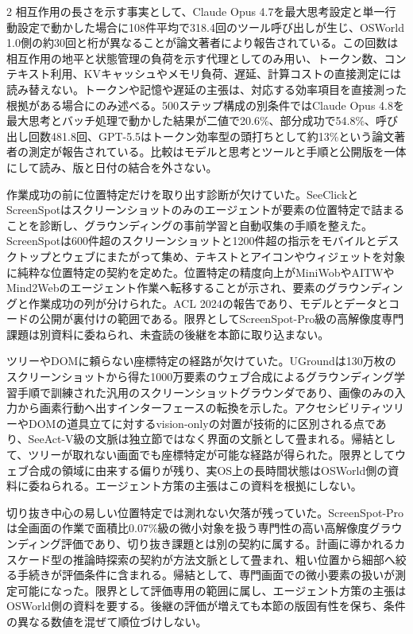 \documentclass[lualatex,a4paper,10pt]{jlreq}
\begin{document}
\begin{multicols}{2}
\noindent 相互作用の長さを示す事実として、Claude Opus 4.7を最大思考設定と単一行動設定で動かした場合に108件平均で318.4回のツール呼び出しが生じ、OSWorld 1.0側の約30回と桁が異なることが論文著者により報告されている。この回数は相互作用の地平と状態管理の負荷を示す代理としてのみ用い、トークン数、コンテキスト利用、KVキャッシュやメモリ負荷、遅延、計算コストの直接測定には読み替えない。トークンや記憶や遅延の主張は、対応する効率項目を直接測った根拠がある場合にのみ述べる。500ステップ構成の別条件ではClaude Opus 4.8を最大思考とバッチ処理で動かした結果が二値で20.6\%、部分成功で54.8\%、呼び出し回数481.8回、GPT-5.5はトークン効率型の頭打ちとして約13\%という論文著者の測定が報告されている。比較はモデルと思考とツールと手順と公開版を一体にして読み、版と日付の結合を外さない。\autocite{vmd091}\par\medskip
\noindent 作業成功の前に位置特定だけを取り出す診断が欠けていた。SeeClickとScreenSpotはスクリーンショットのみのエージェントが要素の位置特定で詰まることを診断し、グラウンディングの事前学習と自動収集の手順を整えた。ScreenSpotは600件超のスクリーンショットと1200件超の指示をモバイルとデスクトップとウェブにまたがって集め、テキストとアイコンやウィジェットを対象に純粋な位置特定の契約を定めた。位置特定の精度向上がMiniWobやAITWやMind2Webのエージェント作業へ転移することが示され、要素のグラウンディングと作業成功の列が分けられた。ACL 2024の報告であり、モデルとデータとコードの公開が裏付けの範囲である。限界としてScreenSpot-Pro級の高解像度専門課題は別資料に委ねられ、未査読の後継を本節に取り込まない。\autocite{vmd092}\par\medskip
\noindent ツリーやDOMに頼らない座標特定の経路が欠けていた。UGroundは130万枚のスクリーンショットから得た1000万要素のウェブ合成によるグラウンディング学習手順で訓練された汎用のスクリーンショットグラウンダであり、画像のみの入力から画素行動へ出すインターフェースの転換を示した。アクセシビリティツリーやDOMの道具立てに対するvision-onlyの対置が技術的に区別される点であり、SeeAct-V級の文脈は独立節ではなく界面の文脈として畳まれる。帰結として、ツリーが取れない画面でも座標特定が可能な経路が得られた。限界としてウェブ合成の領域に由来する偏りが残り、実OS上の長時間状態はOSWorld側の資料に委ねられる。エージェント方策の主張はこの資料を根拠にしない。\autocite{vmd119}\par\medskip
\noindent 切り抜き中心の易しい位置特定では測れない欠落が残っていた。ScreenSpot-Proは全画面の作業で面積比0.07\%級の微小対象を扱う専門性の高い高解像度グラウンディング評価であり、切り抜き課題とは別の契約に属する。計画に導かれるカスケード型の推論時探索の契約が方法文脈として畳まれ、粗い位置から細部へ絞る手続きが評価条件に含まれる。帰結として、専門画面での微小要素の扱いが測定可能になった。限界として評価専用の範囲に属し、エージェント方策の主張はOSWorld側の資料を要する。後継の評価が増えても本節の版固有性を保ち、条件の異なる数値を混ぜて順位づけしない。\autocite{vmd120}\par\medskip

\end{multicols}
\end{document}
